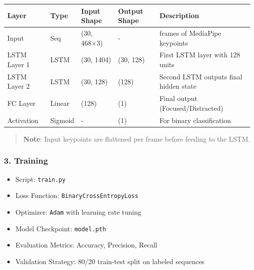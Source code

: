 \documentclass[
  letterpaper,
  DIV=11,
  numbers=noendperiod]{scrreport}
\providecommand{\tightlist}{%
  \setlength{\itemsep}{0pt}\setlength{\parskip}{0pt}}
\begin{document}
\begin{longtable}[]{@{}
  >{\raggedright\arraybackslash}p{}
  >{\raggedright\arraybackslash}p{}
  >{\raggedright\arraybackslash}p{}
  >{\raggedright\arraybackslash}p{}
  >{\raggedright\arraybackslash}p{}@{}}
\toprule\noalign{}
\begin{minipage}[b]{\linewidth}\raggedright
Layer
\end{minipage} & \begin{minipage}[b]{\linewidth}\raggedright
Type
\end{minipage} & \begin{minipage}[b]{\linewidth}\raggedright
Input Shape
\end{minipage} & \begin{minipage}[b]{\linewidth}\raggedright
Output Shape
\end{minipage} & \begin{minipage}[b]{\linewidth}\raggedright
Description
\end{minipage} \\
\midrule\noalign{}
\endhead
\bottomrule\noalign{}
\endlastfoot
Input & Seq & (30, 468×3) & - & 30 frames of MediaPipe keypoints \\
LSTM Layer 1 & LSTM & (30, 1404) & (30, 128) & First LSTM layer with 128
units \\
LSTM Layer 2 & LSTM & (30, 128) & (128) & Second LSTM outputs final
hidden state \\
FC Layer & Linear & (128) & (1) & Final output (Focused/Distracted) \\
Activation & Sigmoid & - & (1) & For binary classification \\
\end{longtable}

\begin{quote}
\textbf{Note}: Input keypoints are flattened per frame before feeding to
the LSTM.
\end{quote}

\subsubsection{3. Training}\label{training}

\begin{itemize}
\tightlist
\item
  Script: \texttt{train.py}
\item
  Loss Function: \texttt{BinaryCrossEntropyLoss}
\item
  Optimizer: \texttt{Adam} with learning rate tuning
\item
  Model Checkpoint: \texttt{model.pth}
\item
  Evaluation Metrics: Accuracy, Precision, Recall
\item
  Validation Strategy: 80/20 train-test split on labeled sequences
\end{itemize}
\end{document}
